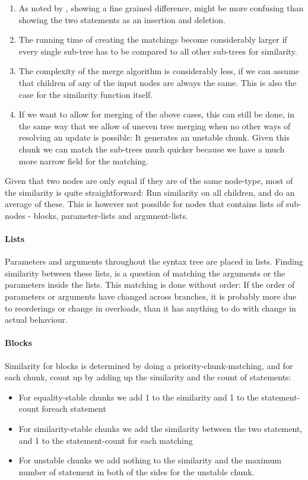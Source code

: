 \documentclass[11pt]{article}
\begin{document}
\begin{enumerate}
\item As noted by \citet{Hashimoto}, showing a fine grained difference, might be more confusing than showing the two statements as an insertion and deletion.
\item The running time of creating the matchings become considerably larger if every single sub-tree has to be compared to all other sub-trees  for similarity.
\item The complexity of the merge algorithm is considerably less, if we can assume that children of any of the input nodes are always the same. This is also the case for the similarity function itself.
\item If we want to allow for merging of the above cases, this can still be done, in the same way that we allow of uneven tree merging when no other ways of resolving an update is possible: It generates an unstable chunk. Given this chunk we can match the sub-trees much quicker because we have a much more narrow field for the matching.
\end{enumerate}

Given that two nodes are only equal if they are of the same node-type, most of the similarity is quite straightforward: Run similarity on all children, and do an average of these. This is however not possible for nodes that contains lists of sub-nodes - blocks, parameter-lists and argument-lists.

\paragraph{Lists} Parameters and arguments throughout the syntax tree are placed in lists. Finding similarity between these lists, is a question of matching the arguments or the parameters inside the lists. This matching is done without order: If the order of parameters or arguments have changed across branches, it is probably more due to reorderings or change in overloads, than it has anything to do with change in actual behaviour.

\paragraph{Blocks} Similarity for blocks is determined by doing a priority-chunk-matching, and for each chunk, count up by adding up the similarity and the count of statements:

\begin{itemize}
	\item For equality-stable chunks we add 1 to the similarity and 1 to the statement-count foreach statement
	\item For similarity-stable chunks we add the similarity between the two statement, and 1 to the statement-count for each matching
	\item For unstable chunks we add nothing to the similarity and the maximum number of statement in both of the sides for the unstable chunk.
\end{itemize}
\end{document}
